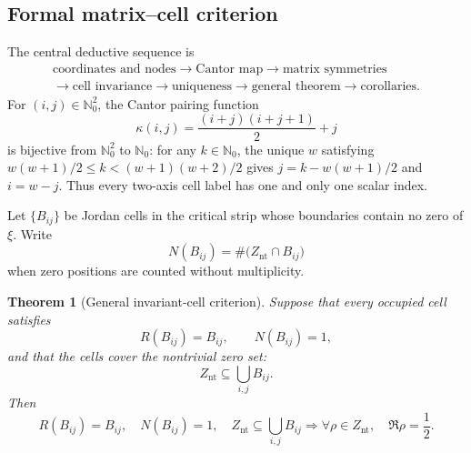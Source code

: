 \documentclass[11pt]{article}
\newtheorem{theorem}[definition]{Theorem}
\newcommand{\Znt}{Z_{\mathrm{nt}}}
\begin{document}
\subsection{Formal matrix--cell criterion}
The central deductive sequence is
\begin{equation}\label{eq:matrix-cell-sequence}
 \boxed{\begin{gathered}
 \text{coordinates and nodes}
 \longrightarrow \text{Cantor map}
 \longrightarrow \text{matrix symmetries}\\
 \longrightarrow \text{cell invariance}
 \longrightarrow \text{uniqueness}
 \longrightarrow \text{general theorem}
 \longrightarrow \text{corollaries}.
 \end{gathered}}
\end{equation}
For $(i,j)\in\mathbb N_0^2$, the Cantor pairing function
\begin{equation}\label{eq:cantor-cell-map}
 \kappa(i,j)=\frac{(i+j)(i+j+1)}2+j
\end{equation}
is bijective from $\mathbb N_0^2$ to $\mathbb N_0$: for any $k\in\mathbb N_0$, the unique
$w$ satisfying $w(w+1)/2\le k<(w+1)(w+2)/2$ gives
$j=k-w(w+1)/2$ and $i=w-j$.  Thus every two-axis cell label has one and only one scalar
index.

Let $\{B_{ij}\}$ be Jordan cells in the critical strip whose boundaries contain no zero of
$\xi$.  Write
\begin{equation}\label{eq:cell-position-count}
 N(B_{ij})=\#\bigl(\Znt\cap B_{ij}\bigr)
\end{equation}
when zero positions are counted without multiplicity.

\begin{theorem}[General invariant-cell criterion]\label{thm:invariant-cell-general}
Suppose that every occupied cell satisfies
\begin{equation}\label{eq:invariant-unit-cell}
 R(B_{ij})=B_{ij},\qquad N(B_{ij})=1,
\end{equation}
and that the cells cover the nontrivial zero set:
\begin{equation}\label{eq:cell-coverage}
 \Znt\subseteq\bigcup_{i,j}B_{ij}.
\end{equation}
Then
\begin{equation}\label{eq:central-cell-corollary}
 \boxed{
 R(B_{ij})=B_{ij},\quad
 N(B_{ij})=1,\quad
 \Znt\subseteq\bigcup_{i,j}B_{ij}
 \Longrightarrow
 \forall\rho\in\Znt,\quad\Re\rho=\frac12.}
\end{equation}
\end{theorem}
\end{document}
